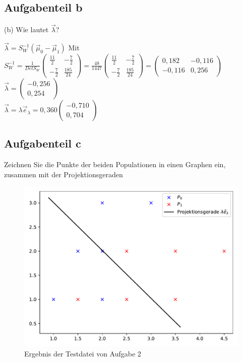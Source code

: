 \documentclass[11pt,a4paper]{article}
\begin{document}
\subsection*{Aufgabenteil b}
(b) Wie lautet $\vec{\lambda}$?

\noindent $ \vec{\lambda}=
S_W^{-1}(\vec{\mu}_0-\vec{\mu}_1)
$
Mit $
S_W^{-1}= \frac{1}{Det S_W} \begin{pmatrix}
\frac{11}{2} & -\frac{7}{2} \\
-\frac{7}{2} & \frac{185}{24}
\end{pmatrix}= \frac{48}{1447}\begin{pmatrix}
\frac{11}{2} & -\frac{7}{2} \\
-\frac{7}{2} & \frac{185}{24}
\end{pmatrix} =\begin{pmatrix}
0,182 & -0,116 \\
-0,116 & 0,256
\end{pmatrix}
$
\rightarrow
$ \vec{\lambda} = \begin{pmatrix}
-0,256  \\
0,254
\end{pmatrix}
$ \\
$\vec{\lambda}= \lambda \vec{e}_{\lambda} = 0,360
\begin{pmatrix}
-0,710  \\
0,704
\end{pmatrix}
$

\subsection*{Aufgabenteil c}
Zeichnen Sie die Punkte der beiden Populationen in einen Graphen ein, zusammen mit der Projektionsgeraden

\begin{figure}[h]

	\centering

	\includegraphics[width=\textwidth]{c.pdf}

	\caption{Ergebnis der Testdatei von Aufgabe 2}

\end{figure}
\end{document}
